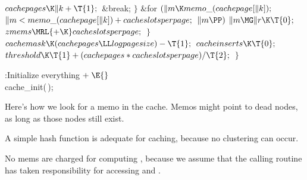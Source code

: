 ${}\\{cachepages}\K\|k+\T{1};{}$\6
\&{break};\6
\4${}\}{}$\2\6
\&{for} ${}(\|m\K\\{memo\_}(\\{cachepage}[\|k]);{}$ ${}\|m<\\{memo\_}(%
\\{cachepage}[\|k])+\\{cacheslotsperpage};{}$ ${}\|m\PP){}$\1\5
${}\|m\MG\|r\K\T{0};{}$\2\6
${}\\{zmems}\MRL{+{\K}}\\{cacheslotsperpage};{}$\6
\4${}\}{}$\2\6
${}\\{cachemask}\K(\\{cachepages}\LL\\{logpagesize})-\T{1};{}$\6
${}\\{cacheinserts}\K\T{0};{}$\6
${}\\{threshold}\K\T{1}+(\\{cachepages}*\\{cacheslotsperpage})/\T{2};{}$\6
\4${}\}{}$\2\par
\fi

\B{}:Initialize everything\X${}\mathrel+\E{}$\6
\\{cache\_init}(\,);\par
\fi

Here's how we look for a memo in the cache. Memos might
point to dead
nodes, as long as those nodes still exist.

A simple hash function is adequate for caching, because no clustering
can occur.

No mems are charged for computing , because we assume that
the calling routine has taken responsibility for accessing 
and .

